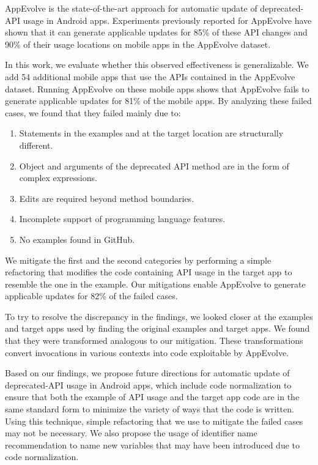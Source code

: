 AppEvolve is the state-of-the-art approach for automatic update of
deprecated-API usage in Android apps. Experiments previously reported for
AppEvolve have shown that it can generate applicable updates for
85\% of these API
changes and 90\% of their usage locations on mobile apps in the
AppEvolve dataset.

In this work, we evaluate whether this observed effectiveness is
generalizable. We add 54 additional mobile apps that use the APIs contained
in the AppEvolve dataset. Running AppEvolve on these mobile apps shows that
AppEvolve fails to generate applicable updates for 81\% of the mobile
apps. By analyzing these failed cases, we found that they failed mainly
due to:
\begin{enumerate}
    \item Statements in the examples and at the target location are structurally different.
    \item Object and arguments of the deprecated API method are in the form of complex expressions.
    \item Edits are required beyond method boundaries.
    \item Incomplete support of programming language features.
    \item No examples found in GitHub.
\end{enumerate}
We mitigate the first and the second categories by performing a simple
refactoring that modifies the code containing API usage in the target app
to resemble the one in the example. Our mitigations enable AppEvolve
to generate applicable updates for 82\% of the failed cases.

To try to resolve the discrepancy in the findings, we looked closer at the
examples and target apps used by finding the original examples and target
apps. We found that they were transformed analogous to our mitigation.
These transformations convert invocations in various contexts into code
exploitable by AppEvolve.

Based on our findings, we propose future directions for automatic update of
deprecated-API usage in Android apps, which include code normalization to
ensure that both the example of API usage and the target app code are in
the same standard form to minimize the variety of ways that the code is
written. Using this technique, simple refactoring that we use to mitigate
the failed cases may not be necessary. We also propose the usage of
identifier name recommendation to name new variables that may have been
introduced due to code normalization.

